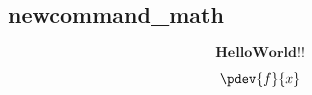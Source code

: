 \documentclass{article}
\begin{document}
\begin{CJK*}{UTF8}{bsmi}

  
\section*{newcommand\_math}
\newcommand{\hi}{\mathbf{Hello World!!}}
$$ \hi $$

$$ \pdev{f}{x} $$



\end{CJK*}
\end{document}
